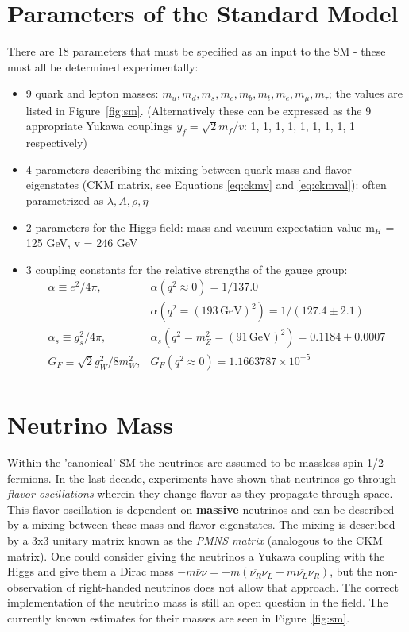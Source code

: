 \section{Parameters of the Standard Model}

There are 18 parameters that must be specified as an input to the SM - these must all be determined experimentally:

\begin{itemize}
\item 9 quark and lepton masses: $m_{u}, m_{d}, m_{s}, m_{c}, m_{b}, m_{t}, m_{e}, m_{\mu}, m_{\tau}$; the values are listed in Figure~\ref{fig:sm}. (Alternatively these can be expressed as the 9 appropriate Yukawa couplings $y_{f}=\sqrt{2}m_{f} / v$: 1, 1, 1, 1, 1, 1, 1, 1, 1 respectively)
\item 4 parameters describing the mixing between quark mass and flavor eigenstates (CKM matrix, see Equations \ref{eq:ckmv} and \ref{eq:ckmval}): often parametrized as $\lambda, A, \rho, \eta$
\item 2 parameters for the Higgs field: mass and vacuum expectation value m$_{H}$ = 125 GeV, v = 246 GeV 
\item 3 coupling constants for the relative strengths of the gauge group:
\begin{equation*}
\begin{array}{ll}
\alpha \equiv e^{2} / 4 \pi, & \alpha(q^{2} \approx 0) = 1 / 137.0 \\
 & \alpha(q^{2} = (193\,\mathrm{GeV})^{2}) = 1 / (127.4\pm 2.1)\\
\alpha_{s} \equiv g_{s}^{2} / 4 \pi,  & \alpha_{s}(q^{2}=m_{Z}^{2} = (91\,\mathrm{GeV})^{2})= 0.1184 \pm 0.0007\\
G_{F} \equiv \sqrt{2} g^{2}_{W} / 8 m_{W}^{2}, & G_{F} (q^{2}\approx0) = 1.1663787\times10^{-5} \\

\end{array}
\end{equation*}
\end{itemize}

\section{Neutrino Mass}

Within the 'canonical' SM the neutrinos are assumed to be massless spin-1/2 fermions. In the last decade, experiments have shown that neutrinos go through \textit{flavor oscillations} wherein they change flavor as they propagate through space. This flavor oscillation is dependent on \textbf{massive} neutrinos and can be described by a mixing between these mass and flavor eigenstates. The mixing is described by a 3x3 unitary matrix known as the \textit{PMNS matrix} (analogous to the CKM matrix). One could consider giving the neutrinos a Yukawa coupling with the Higgs and give them a Dirac mass $-m\bar{\nu}\nu = -m(\overline{\nu_{R}}\nu_{L} + m\overline{\nu_{L}}\nu_{R})$, but the non-observation of right-handed neutrinos does not allow that approach. The correct implementation of the neutrino mass is still an open question in the field. The currently known estimates for their masses are seen in Figure~\ref{fig:sm}.

